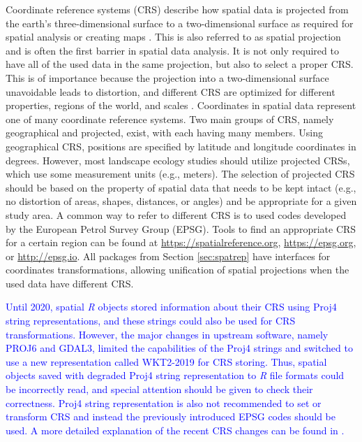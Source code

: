\documentclass[smallextended]{svjour3}       %
\begin{document}
Coordinate reference systems (CRS) describe how spatial data is projected from the earth's three-dimensional surface to a two-dimensional surface as required for spatial analysis or creating maps \cite{Lovelace2019,Pebesma2019a}.
This is also referred to as spatial projection and is often the first barrier in spatial data analysis.
It is not only required to have all of the used data in the same projection, but also to select a proper CRS.
This is of importance because the projection into a two-dimensional surface unavoidable leads to distortion, and different CRS are optimized for different properties, regions of the world, and scales \cite{Bivand2013,Lovelace2019}.
Coordinates in spatial data represent one of many coordinate reference systems.
Two main groups of CRS, namely geographical and projected, exist, with each having many members.
Using geographical CRS, positions are specified by latitude and longitude coordinates in degrees.
However, most landscape ecology studies should utilize projected CRSs, which use some measurement units (e.g., meters).
The selection of projected CRS should be based on the property of spatial data that needs to be kept intact (e.g., no distortion of areas, shapes, distances, or angles) and be appropriate for a given study area.
A common way to refer to different CRS is to used codes developed by the European Petrol Survey Group (EPSG).
Tools to find an appropriate CRS for a certain region can be found at \url{https://spatialreference.org}, \url{https://epsg.org}, or \url{http://epsg.io}.
All packages from Section \ref{sec:spatrep} have interfaces for coordinates transformations, allowing unification of spatial projections when the used data have different CRS.

\textcolor{blue}{Until 2020, spatial \textit{R} objects stored information about their CRS using Proj4 string representations, and these strings could also be used for CRS transformations.
However, the major changes in upstream software, namely PROJ6 and GDAL3, limited the capabilities of the Proj4 strings and switched to use a new representation called WKT2-2019 for CRS storing.
Thus, spatial objects saved with degraded Proj4 string representation to \textit{R} file formats could be incorrectly read, and special attention should be given to check their correctness.
Proj4 string representation is also not recommended to set or transform CRS and instead the previously introduced EPSG codes should be used.
A more detailed explanation of the recent CRS changes can be found in \cite{Bivand2020}.}
\end{document}
